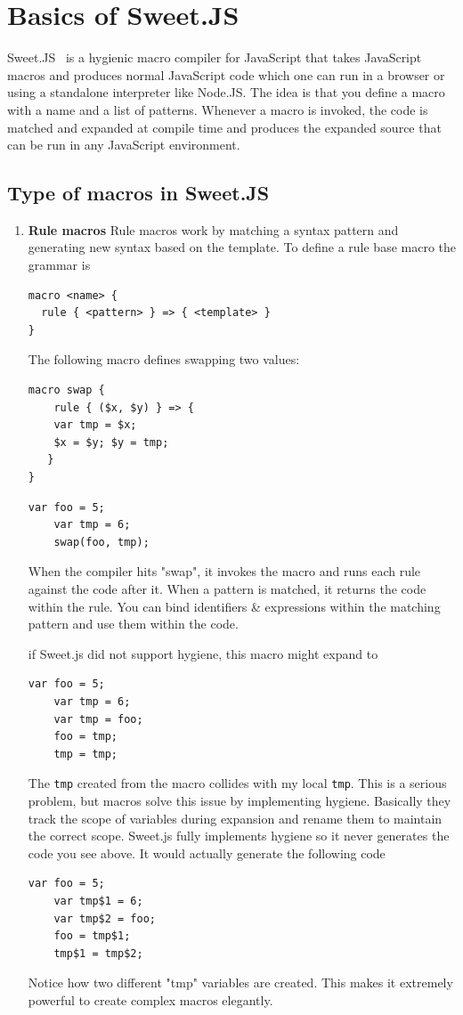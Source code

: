 \chapter{Basics of Sweet.JS}
Sweet.JS~\cite{bib6} is a hygienic macro compiler for JavaScript that takes JavaScript macros and produces normal JavaScript code which one can run in a browser or using a standalone interpreter like Node.JS. The idea is that you define a macro with a name and a list of patterns. Whenever a macro is invoked, the code is matched and expanded at  compile time and produces the expanded source that can be run in any JavaScript environment. 
\section{Type of macros in Sweet.JS}
\begin{enumerate}
\item {\bf Rule macros }
Rule macros work by matching a syntax pattern and generating new syntax based on the template.
To define a rule base macro the grammar is
\begin{lstlisting}[frame=single]
macro <name> {
  rule { <pattern> } => { <template> }
}
\end{lstlisting} 

The following macro defines swapping two values:
\begin{lstlisting}[frame=single]
macro swap {
	rule { ($x, $y) } => {
	var tmp = $x;
	$x = $y; $y = tmp;
   }
}
\end{lstlisting}
\begin{lstlisting}[frame=single]
	var foo = 5;
	var tmp = 6;
	swap(foo, tmp);
\end{lstlisting} 

When the compiler hits "swap", it invokes the macro and runs each rule against the code after it. When a pattern is matched, it returns the code within the rule. You can bind identifiers \& expressions within the matching pattern and use them within the code.

if Sweet.js did not support hygiene, this macro might expand to
\begin{lstlisting}[frame=single]
	var foo = 5;
	var tmp = 6;
	var tmp = foo;
	foo = tmp;
	tmp = tmp;
\end{lstlisting} 
The \texttt{tmp} created from the macro collides with my local \texttt{tmp}. This is a serious problem, but macros solve this issue by implementing hygiene. Basically they track the scope of variables during expansion and rename them to maintain the correct scope. Sweet.js fully implements hygiene so it never generates the code you see above. It would actually generate the following code
\begin{lstlisting}[frame=single]
	var foo = 5;
	var tmp$1 = 6;
	var tmp$2 = foo;
	foo = tmp$1;
	tmp$1 = tmp$2;
\end{lstlisting} 
Notice how two different "tmp" variables are created. This makes it extremely powerful to create complex macros elegantly.


\end{enumerate}
